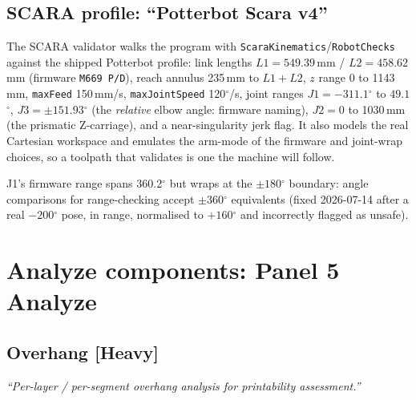 \documentclass[11pt]{article}
\newcommand{\param}[1]{\texttt{#1}}
\newcommand{\iamdeg}{$^{\circ}$}
\newcommand{\heavy}{\textbf{[Heavy]}}
\begin{document}
\subsection{SCARA profile: ``Potterbot Scara v4''}

The SCARA validator walks the program with
\param{ScaraKinematics}/\param{RobotChecks} against the shipped
Potterbot profile: link lengths $L1 = 549.39$\,mm / $L2 = 458.62$\,mm
(firmware \texttt{M669 P/D}), reach annulus 235\,mm to $L1{+}L2$, $z$
range 0 to 1143\,mm, \param{maxFeed} 150\,mm/s, \param{maxJointSpeed}
120\iamdeg/s, joint ranges $J1 = -311.1$\iamdeg{} to $49.1$\iamdeg,
$J3 = \pm 151.93$\iamdeg{} (the \emph{relative} elbow angle: firmware
naming), $J2 = 0$ to 1030\,mm (the prismatic Z-carriage), and a
near-singularity jerk flag. It also models the real Cartesian workspace
and emulates the arm-mode of the firmware and joint-wrap choices, so a
toolpath that validates is one the machine will follow.

J1's firmware range spans 360.2\iamdeg{} but wraps at the $\pm 180$\iamdeg{}
boundary: angle comparisons for range-checking accept $\pm 360$\iamdeg{}
equivalents (fixed 2026-07-14 after a real $-200$\iamdeg{} pose, in range,
normalised to $+160$\iamdeg{} and incorrectly flagged as unsafe).

\section{Analyze components: Panel 5 Analyze}

\subsection{Overhang \heavy{}}

\emph{``Per-layer / per-segment overhang analysis for printability
assessment.''}
\end{document}

